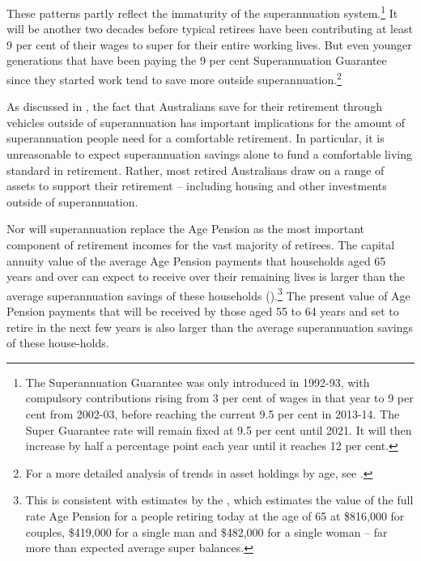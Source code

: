 These patterns partly reflect the immaturity of the superannuation system.\footnote{%
The Superannuation Guarantee was only introduced in 1992-93, with compulsory contributions rising from 3 per cent of wages in that year to 9 per cent from 2002-03, before reaching the current 9.5 per cent in 2013-14. The Super Guarantee rate will remain fixed at 9.5 per cent until 2021. It will then increase by half a percentage point each year until it reaches 12 per cent. 
} It will be another two decades before typical retirees have been contributing at least 9 per cent of their wages to super for their entire working lives. But even younger generations that have been paying the 9 per cent Superannuation Guarantee since they started work tend to save more outside superannuation.\footnote{For a more detailed analysis of trends in asset holdings by age, see \textcite[][14]{DaleyWoodWeidmannEtAl2014}.}  


As discussed in , the fact that Australians save for their retirement through vehicles outside of superannuation has important implications for the amount of superannuation people need for a comfortable retirement. In particular, it is unreasonable to expect superannuation savings alone to fund a comfortable living standard in retirement. Rather, most retired Australians draw on a range of assets to support their retirement – including housing and other investments outside of superannuation. 

Nor will superannuation replace the Age Pension as the most important component of retirement incomes for the vast majority of retirees. The capital annuity value of the average Age Pension payments that households aged 65 years and over can expect to receive over their remaining lives is larger than the average superannuation savings of these households ().\footnote{This is consistent with estimates by the \textcite[][7]{ActuariesInstitute2015RetirementIncomes}, which estimates the value of the full rate Age Pension for a people retiring today at the age of 65 at \$816,000 for couples, \$419,000 for a single man and \$482,000 for a single woman – far more than expected average super balances.} The present value of Age Pension payments that will be received by those aged 55 to 64 years and set to retire in the next few years is also larger than the average superannuation savings of these house-holds. 

